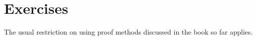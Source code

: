 \documentclass{book}[12pt]
\begin{document}
\begin{comment}
\section{Termination Casts}

Termination of higher-order functions is typically conditional on
termination of any functional arguments they take in.  For example,
the \texttt{member} function, defined in \texttt{lib/list.g}, has this
type (dropping some ownership annotations):

\begin{verbatim}
Fun(A:type)(x:A)(l:<list A>)
   (eqA:Fun(owned x1 x2:A).bool).
 bool
\end{verbatim}

\noindent So \texttt{member} takes in a type \texttt{A}, an element
\texttt{x} of type \texttt{A}, and a list \texttt{l} of \texttt{A}s.
The goal is to test whether or not \texttt{x} is a member of
\texttt{l}.  For this to be possible, however, \texttt{member} needs a
function \texttt{eqA} to test equality of elements of type \texttt{A}.
Without such a function, \texttt{member} has no way to check whether
\texttt{x} is equal to an element \texttt{a} of the list.

Termination of \texttt{member} is predicated on termination of this
\texttt{eqA} function: if it were to diverge, then so would
\texttt{member}.  So \texttt{member} is, in fact, a partial function.
It terminates on some inputs (namely those where \texttt{eqA} is
terminated), but diverges on other (where \texttt{eqA} is diverging
and the list is non-empty).  
\end{comment}

\section{Exercises}

The usual restriction on using proof methods discussed in the book so far applies.
\end{document}
